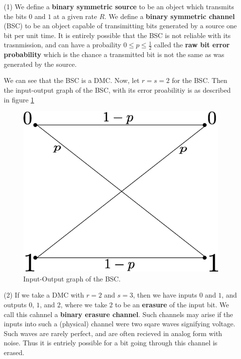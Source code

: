 \begin{example}
    \begin{enumerate}
        \item[(1)] We define a \textbf{binary symmetric source} to be an object
            which transmits the bits $0$ and $1$ at a given rate  $R$. We define
            a  \textbf{binary symmetric channel} (BSC) to be an object capable of
            transimitting bits generated by a source one bit per unit time. It
            is entirely possible that the BSC is not reliable with its
            trasnmission, and can have a probaility $0 \leq p \leq \frac{1}{2}$
            called the \textbf{raw bit error probability} which is the chance a
            transmitted bit is not the same as was generated by the source.

            We can see that the BSC is a DMC. Now, let $r=s=2$ for the BSC. Then
            the input-output graph of the BSC, with its error proabilitiy is as
            described in figure \ref{fig_2.4}
            \begin{figure}
                \centering
                \includegraphics[scale=0.3]{Figures/Chapter2/dmc_3.eps}
                \caption{Input-Output graph of the BSC.}
                \label{fig_2.4}
            \end{figure}

        \item[(2)] If we take a DMC with $r=2$ and  $s=3$, then we have inputs
            $0$ and $1$, and outputs $0$, $1$, and $2$, where we take $2$ to be
            an  \textbf{erasure} of the input bit. We call this cahnnel a
            \textbf{binary erasure channel}. Such channels may arise if the
            inputs into such a (physical) channel were two sqare waves
            signifying voltage. Such waves are rarely perfect, and are often
            recieved in analog form with noise. Thus it is entriely possible for
            a bit going through this channel is erased.
    \end{enumerate}
\end{example}

